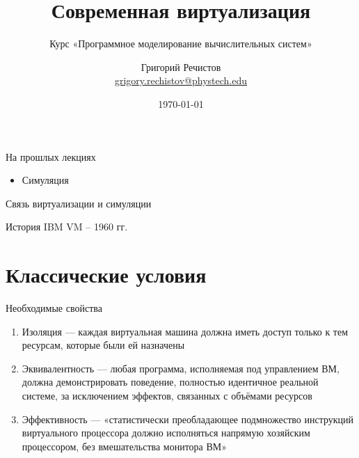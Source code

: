 \documentclass{beamer}
\title{Современная виртуализация}
\subtitle{Курс «Программное моделирование вычислительных систем»}
\author[]{Григорий Речистов \\ \small{\href{mailto:grigory.rechistov@phystech.edu}{grigory.rechistov@phystech.edu}}}
\date{\today}
\begin{document}
\begin{frame}
\titlepage
\end{frame}

\begin{frame}
\tableofcontents
\end{frame}


\begin{frame}{На прошлых лекциях}
\begin{itemize}
\item Симуляция
\end{itemize}

\end{frame}


\begin{frame}{Связь виртуализации и симуляции}

\centering


\vfill



\end{frame}

\begin{frame}{История}
IBM VM – 1960 гг.

\cite{goldberg}

\end{frame}

\section{Классические условия}

\begin{frame}{Необходимые свойства}

\begin{enumerate}
\item Изоляция — каждая виртуальная машина должна иметь доступ только к тем ресурсам, которые были ей назначены
\item Эквивалентность — любая программа, исполняемая под управлением ВМ, должна демонстрировать поведение, полностью идентичное реальной системе, за исключением эффектов, связанных с объёмами ресурсов
\item Эффективность — «статистически преобладающее подмножество инструкций виртуального процессора должно исполняться напрямую хозяйским процессором, без вмешательства монитора ВМ»
\end{enumerate}

\end{frame}
\end{document}
